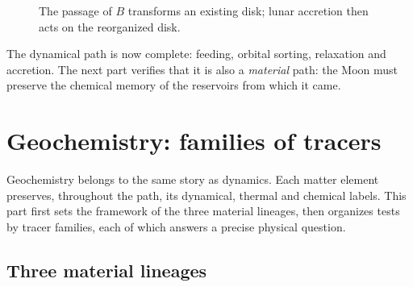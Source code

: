 \documentclass[11pt,a4paper,openany]{report}
\begin{document}
\begin{figure}[htbp]
\centering
{}
\caption{The passage of $B$ transforms an existing disk; lunar accretion then acts on the
reorganized disk.}
\label{fig:flux}
\end{figure}

\begin{rappel}
The dynamical path is now complete: feeding, orbital sorting, relaxation and accretion. The next
part verifies that it is also a \emph{material} path: the Moon must preserve the chemical memory of
the reservoirs from which it came.
\end{rappel}

\part{Geochemistry: families of tracers}
\label{part:geochimie}

\noindent
Geochemistry belongs to the same story as dynamics. Each matter element preserves, throughout the
path, its dynamical, thermal and chemical labels. This part first sets the framework of the three
material lineages, then organizes tests by tracer families, each of which answers a precise
physical question.

\chapter{Three material lineages}
\label{sec:geochimie}
\end{document}
